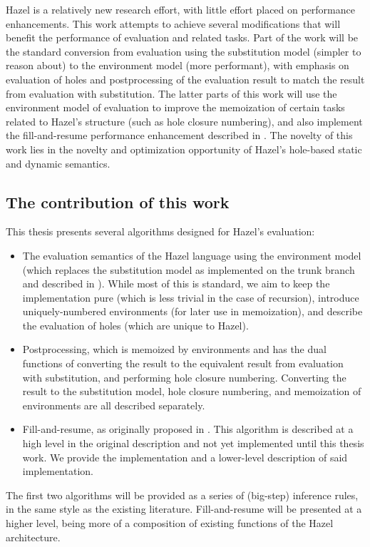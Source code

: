 Hazel is a relatively new research effort, with little effort placed on performance enhancements. This work attempts to achieve several modifications that will benefit the performance of evaluation and related tasks. Part of the work will be the standard conversion from evaluation using the substitution model (simpler to reason about) to the environment model (more performant), with emphasis on evaluation of holes and postprocessing of the evaluation result to match the result from evaluation with substitution. The latter parts of this work will use the environment model of evaluation to improve the memoization of certain tasks related to Hazel's structure (such as hole closure numbering), and also implement the fill-and-resume performance enhancement described in \cite{conf/popl/HazelnutLive19}. The novelty of this work lies in the novelty and optimization opportunity of Hazel's hole-based static and dynamic semantics.

\subsection{The contribution of this work}
\label{sec:contribution}

This thesis presents several algorithms designed for Hazel's evaluation:
\begin{itemize}
\item The evaluation semantics of the Hazel language using the environment model (which replaces the substitution model as implemented on the trunk branch and described in \cite{conf/popl/HazelnutLive19}). While most of this is standard, we aim to keep the implementation pure (which is less trivial in the case of recursion), introduce uniquely-numbered environments (for later use in memoization), and describe the evaluation of holes (which are unique to Hazel).
\item Postprocessing, which is memoized by environments and has the dual functions of converting the result to the equivalent result from evaluation with substitution, and performing hole closure numbering. Converting the result to the substitution model, hole closure numbering, and memoization of environments are all described separately.
\item Fill-and-resume, as originally proposed in \cite{conf/popl/HazelnutLive19}. This algorithm is described at a high level in the original description and not yet implemented until this thesis work. We provide the implementation and a lower-level description of said implementation.
\end{itemize}
The first two algorithms will be provided as a series of (big-step) inference rules, in the same style as the existing literature. Fill-and-resume will be presented at a higher level, being more of a composition of existing functions of the Hazel architecture.

